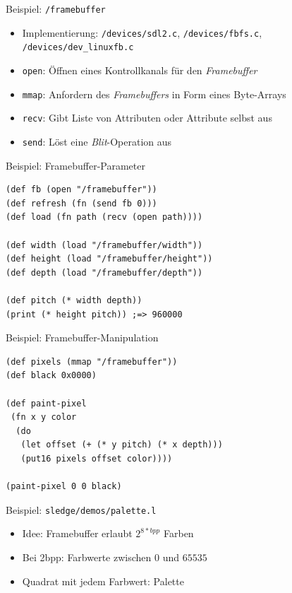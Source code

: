 \documentclass[presentation]{beamer}
\begin{document}
\begin{frame}[fragile,label=sec-4-2]{Beispiel: \texttt{/framebuffer}}
 \begin{itemize}
\item Implementierung: \texttt{/devices/sdl2.c}, \texttt{/devices/fbfs.c},
\texttt{/devices/dev\_linuxfb.c}
\item \texttt{open}: Öffnen eines Kontrollkanals für den \emph{Framebuffer}
\item \texttt{mmap}: Anfordern des \emph{Framebuffers} in Form eines Byte-Arrays
\item \texttt{recv}: Gibt Liste von Attributen oder Attribute selbst aus
\item \texttt{send}: Löst eine \emph{Blit}-Operation aus
\end{itemize}
\end{frame}

\begin{frame}[fragile,label=sec-4-3]{Beispiel: Framebuffer-Parameter}
 \begin{verbatim}
(def fb (open "/framebuffer"))
(def refresh (fn (send fb 0)))
(def load (fn path (recv (open path))))

(def width (load "/framebuffer/width"))
(def height (load "/framebuffer/height"))
(def depth (load "/framebuffer/depth"))

(def pitch (* width depth))
(print (* height pitch)) ;=> 960000
\end{verbatim}
\end{frame}

\begin{frame}[fragile,label=sec-4-4]{Beispiel: Framebuffer-Manipulation}
 \begin{verbatim}
(def pixels (mmap "/framebuffer"))
(def black 0x0000)

(def paint-pixel
 (fn x y color
  (do
   (let offset (+ (* y pitch) (* x depth)))
   (put16 pixels offset color))))

(paint-pixel 0 0 black)
\end{verbatim}
\end{frame}

\begin{frame}[fragile,label=sec-4-5]{Beispiel: \texttt{sledge/demos/palette.l}}
 \begin{itemize}
\item Idee: Framebuffer erlaubt $2^{8*bpp}$ Farben
\item Bei 2bpp: Farbwerte zwischen $0$ und $65535$
\item Quadrat mit jedem Farbwert: Palette
\end{itemize}
\end{frame}
\end{document}
